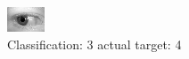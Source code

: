 \begin{figure}[h!]
\begin{center}
\includegraphics[width=0.60\columnwidth]{figures/ID731_class_3_target_4.png}
\end{center}
\caption{ Classification: 3 actual target: 4}
\label{fig:ID731_class_3_target_4}
\end{figure}
